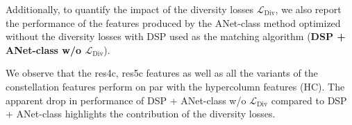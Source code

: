 \documentclass[10pt,twocolumn,letterpaper]{article}
\def\methodname{ANet\xspace}
\newcommand{\myparagraph}[1]{\vspace{0.15cm}\noindent\textbf{#1.}}
\begin{document}
Additionally, to quantify the impact of the diversity losses $\mathcal{L}_{\text{Div}}$, we also report the performance of the features produced by the \methodname-class method optimized without the diversity losses with DSP used as the matching algorithm (\textbf{DSP + \methodname-class w/o $\mathcal{L}_{\text{Div}}$}).

We observe that the res4c, res5c features as well as all the variants of the constellation features perform on par with the hypercolumn features (HC). 
The apparent drop in performance of DSP + \methodname-class w/o $\mathcal{L}_{\text{Div}}$ compared to DSP + \methodname-class highlights the contribution of the diversity losses.

  \centering
  \setlength\tabcolsep{3pt}
  \scriptsize
\end{document}
